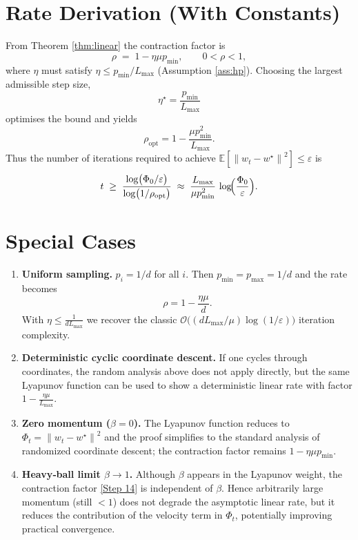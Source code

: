 \documentclass{article}
\newcommand{\E}{\mathbb{E}}
\newcommand{\norm}[1]{\left\|#1\right\|}
\begin{document}
\section*{Rate Derivation (With Constants)}
From Theorem \ref{thm:linear} the contraction factor is
\[
\rho\;=\;1-\eta\mu p_{\min},
\qquad
0<\rho<1,
\]
where $\eta$ must satisfy $\eta\le p_{\min}/L_{\max}$ (Assumption \ref{ass:hp}).  
Choosing the largest admissible step size,
\[
\boxed{\eta^{\star}= \frac{p_{\min}}{L_{\max}}}
\]
optimises the bound and yields
\[
\rho_{\text{opt}} = 1-\frac{\mu p_{\min}^{2}}{L_{\max}}.
\]
Thus the number of iterations required to achieve $\E[\norm{w_t-w^{\star}}^{2}]\le\varepsilon$ is
\[
t\;\ge\;
\frac{\log\bigl(\Phi_0/\varepsilon\bigr)}{\log\bigl(1/\rho_{\text{opt}}\bigr)}
\;\approx\;
\frac{L_{\max}}{\mu p_{\min}^{2}}\,
\log\!\Bigl(\frac{\Phi_0}{\varepsilon}\Bigr).
\]

\section*{Special Cases}
\begin{enumerate}[noitemsep]
\item \textbf{Uniform sampling.} $p_i=1/d$ for all $i$.
Then $p_{\min}=p_{\max}=1/d$ and the rate becomes
\[
\rho = 1-\frac{\eta\mu}{d}.
\]
With $\eta\le \frac{1}{dL_{\max}}$ we recover the classic $\mathcal{O}\bigl((dL_{\max}/\mu)\log(1/\varepsilon)\bigr)$ iteration complexity.

\item \textbf{Deterministic cyclic coordinate descent.}
If one cycles through coordinates, the random analysis above does not apply directly, but the same Lyapunov function can be used to show a deterministic linear rate with factor $1-\frac{\eta\mu}{L_{\max}}$.

\item \textbf{Zero momentum ($\beta=0$).}
The Lyapunov function reduces to $\Phi_t=\norm{w_t-w^{\star}}^{2}$ and the proof simplifies to the standard analysis of randomized coordinate descent; the contraction factor remains $1-\eta\mu p_{\min}$.

\item \textbf{Heavy‑ball limit $\beta\to 1$.}
Although $\beta$ appears in the Lyapunov weight, the contraction factor \eqref{Step 14} is independent of $\beta$. Hence arbitrarily large momentum (still $<1$) does not degrade the asymptotic linear rate, but it reduces the contribution of the velocity term in $\Phi_t$, potentially improving practical convergence.
\end{enumerate}
\end{document}
